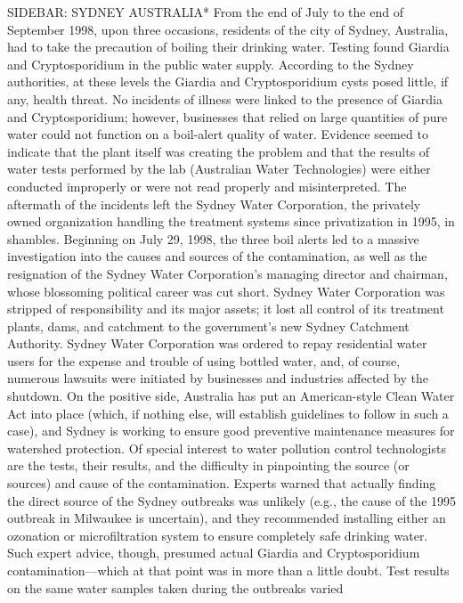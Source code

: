\documentclass{article}
\begin{document}
SIDEBAR: SYDNEY AUSTRALIA* From the end of July to the end of September
1998, upon three occasions, residents of the city of Sydney, Australia,
had to take the precaution of boiling their drinking water. Testing
found Giardia and Cryptosporidium in the public water supply. According
to the Sydney authorities, at these levels the Giardia and
Cryptosporidium cysts posed little, if any, health threat. No incidents
of illness were linked to the presence of Giardia and Cryptosporidium;
however, businesses that relied on large quantities of pure water could
not function on a boil-alert quality of water. Evidence seemed to
indicate that the plant itself was creating the problem and that the
results of water tests performed by the lab (Australian Water
Technologies) were either conducted improperly or were not read properly
and misinterpreted. The aftermath of the incidents left the Sydney Water
Corporation, the privately owned organization handling the treatment
systems since privatization in 1995, in shambles. Beginning on July 29,
1998, the three boil alerts led to a massive investigation into the
causes and sources of the contamination, as well as the resignation of
the Sydney Water Corporation's managing director and chairman, whose
blossoming political career was cut short. Sydney Water Corporation was
stripped of responsibility and its major assets; it lost all control of
its treatment plants, dams, and catchment to the government's new Sydney
Catchment Authority. Sydney Water Corporation was ordered to repay
residential water users for the expense and trouble of using bottled
water, and, of course, numerous lawsuits were initiated by businesses
and industries affected by the shutdown. On the positive side, Australia
has put an American-style Clean Water Act into place (which, if nothing
else, will establish guidelines to follow in such a case), and Sydney is
working to ensure good preventive maintenance measures for watershed
protection. Of special interest to water pollution control technologists
are the tests, their results, and the difficulty in pinpointing the
source (or sources) and cause of the contamination. Experts warned that
actually finding the direct source of the Sydney outbreaks was unlikely
(e.g., the cause of the 1995 outbreak in Milwaukee is uncertain), and
they recommended installing either an ozonation or microfiltration
system to ensure completely safe drinking water. Such expert advice,
though, presumed actual Giardia and Cryptosporidium
contamination---which at that point was in more than a little doubt.
Test results on the same water samples taken during the outbreaks varied
\end{document}
